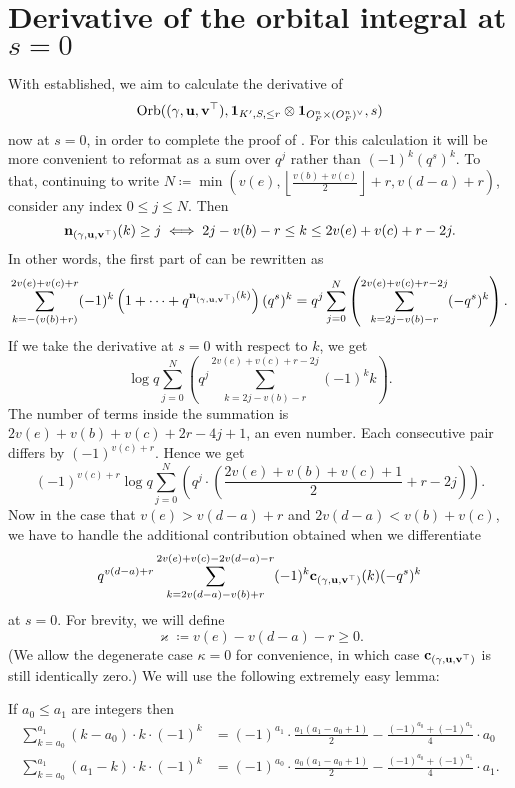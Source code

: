 \section{Derivative of the orbital integral at $s = 0$}
With  established, we aim to calculate the derivative of
\[ \operatorname{Orb}({(\gamma, \mathbf u, \mathbf v^\top)}, \mathbf{1}_{K', S, \le r} \otimes \mathbf{1}_{O_F^n \times (O_F^n)^\vee}, s) \]
now at $s = 0$, in order to complete the proof of .
For this calculation it will be more convenient to reformat 
as a sum over $q^j$ rather than $(-1)^k (q^s)^k$.
To that, continuing to write
$N \coloneqq \min \left(
      v(e), \left\lfloor \tfrac{v(b)+v(c)}{2} \right\rfloor + r,
      v(d-a) + r \right)$,
consider any index $0 \le j \le N$.
Then
\[ \mathbf n_{(\gamma, \mathbf u, \mathbf v^\top)}(k) \ge j \iff 2j - v(b) - r \le k \le 2v(e)+v(c)+r-2j. \]
In other words, the first part of  can be rewritten as
\[ \sum_{k = -(v(b)+r)}^{2v(e)+v(c)+r} (-1)^k
  \left( 1 + \dots + q^{\mathbf n_{(\gamma, \mathbf u, \mathbf v^\top)}(k)} \right) (q^s)^k
  = q^j \sum_{j=0}^N \left( \sum_{k=2j-v(b)-r}^{2v(e)+v(c)+r-2j} (-q^s)^k \right). \]
If we take the derivative at $s = 0$ with respect to $k$, we get
\[ \log q \sum_{j=0}^N \left( q^j \sum_{k=2j-v(b)-r}^{2v(e)+v(c)+r-2j} (-1)^k k \right). \]
The number of terms inside the summation is
$2v(e)+v(b)+v(c)+2r-4j+1$, an even number.
Each consecutive pair differs by $(-1)^{v(c)+r}$.
Hence we get
\[ (-1)^{v(c)+r} \log q \sum_{j=0}^N \left( q^j
  \cdot \left( \frac{2v(e)+v(b)+v(c)+1}{2} + r - 2j \right) \right). \]
Now in the case that $v(e) > v(d-a) + r$ and $2v(d-a) < v(b) + v(c)$,
we have to handle the additional contribution obtained when we differentiate
\begin{equation}
  q^{v(d-a)+r}
  \sum_{k = 2v(d-a)-v(b)+r}^{2v(e)+v(c)-2v(d-a)-r} (-1)^k \mathbf c_{(\gamma, \mathbf u, \mathbf v^\top)}(k) (-q^s)^k
  \label{eq:top_derivative}
\end{equation}
at $s = 0$.
For brevity, we will define
\[ \varkappa \coloneqq v(e) - v(d-a) - r \ge 0. \]
(We allow the degenerate case $\kappa = 0$ for convenience,
in which case $\mathbf c_{(\gamma, \mathbf u, \mathbf v^\top)}$ is still identically zero.)
We will use the following extremely easy lemma:
\begin{lemma}
  If $a_0 \le a_1$ are integers then
  \begin{align*}
    \sum_{k=a_0}^{a_1} (k-a_0) \cdot k \cdot (-1)^k
    &= (-1)^{a_1} \cdot \frac{a_1(a_1-a_0+1)}{2} - \frac{(-1)^{a_0} + (-1)^{a_1}}{4} \cdot a_0 \\
    \sum_{k=a_0}^{a_1} (a_1-k) \cdot k \cdot (-1)^k
    &= (-1)^{a_0} \cdot \frac{a_0(a_1-a_0+1)}{2} - \frac{(-1)^{a_0} + (-1)^{a_1}}{4} \cdot a_1.
  \end{align*}
\end{lemma}
